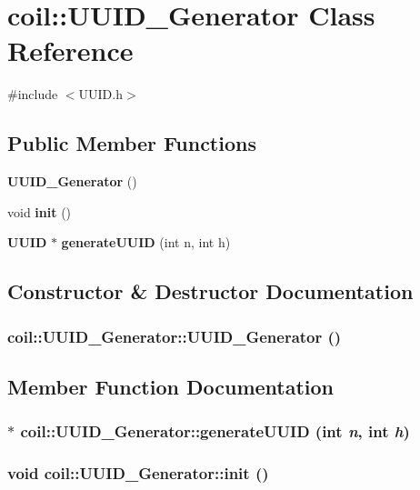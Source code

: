 \section{coil::UUID\_\-Generator Class Reference}
\label{classcoil_1_1UUID__Generator}


{\ttfamily \#include $<$UUID.h$>$}

\subsection*{Public Member Functions}
\begin{DoxyCompactItemize}
\item 
{\bf UUID\_\-Generator} ()
\item 
void {\bf init} ()
\item 
{\bf UUID} $\ast$ {\bf generateUUID} (int n, int h)
\end{DoxyCompactItemize}


\subsection{Constructor \& Destructor Documentation}
\subsubsection[{UUID\_\-Generator}]{\setlength{\rightskip}{0pt plus 5cm}coil::UUID\_\-Generator::UUID\_\-Generator ()}\label{classcoil_1_1UUID__Generator_a1d33ef6dedf0bcafa78b21a929a4e30d}


\subsection{Member Function Documentation}
\subsubsection[{generateUUID}]{$\ast$ coil::UUID\_\-Generator::generateUUID (int {\em n}, \/  int {\em h})}\label{classcoil_1_1UUID__Generator_a3337b868024651506659ffd21c10c2d6}
\subsubsection[{init}]{\setlength{\rightskip}{0pt plus 5cm}void coil::UUID\_\-Generator::init ()}\label{classcoil_1_1UUID__Generator_aa7530e8556288ea101c23e0fd17e53d1}
